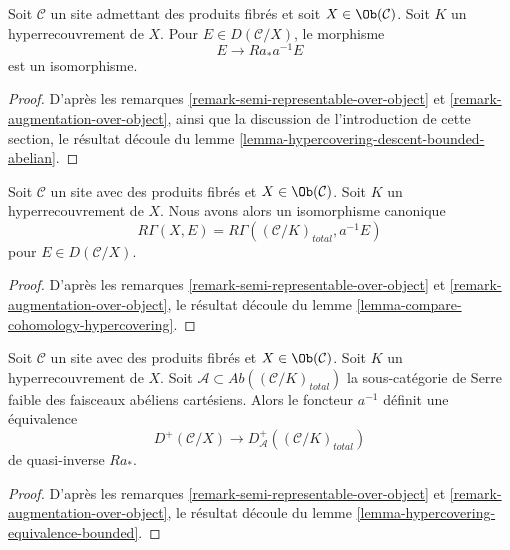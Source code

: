 \begin{lemma}
\label{lemma-hypercovering-X-descent-bounded-abelian}
Soit $\mathcal{C}$ un site admettant des produits fibrés et soit $X \in \Ob(\mathcal{C})$.
Soit $K$ un hyperrecouvrement de $X$. Pour
$E \in D(\mathcal{C}/X)$, le morphisme
$$
E \longrightarrow Ra_*a^{-1}E
$$
est un isomorphisme.
\end{lemma}

\begin{proof}
D'après les remarques \ref{remark-semi-representable-over-object} et
\ref{remark-augmentation-over-object}, ainsi que la discussion de
l'introduction de cette section,
le résultat découle du lemme \ref{lemma-hypercovering-descent-bounded-abelian}.
\end{proof}

\begin{lemma}
\label{lemma-compare-cohomology-hypercovering-X}
Soit $\mathcal{C}$ un site avec des produits fibrés et $X \in \Ob(\mathcal{C})$.
Soit $K$ un hyperrecouvrement de $X$.
Nous avons alors un isomorphisme canonique
$$
R\Gamma(X, E) = R\Gamma((\mathcal{C}/K)_{total}, a^{-1}E)
$$
pour $E \in D(\mathcal{C}/X)$.
\end{lemma}

\begin{proof}
D'après les remarques \ref{remark-semi-representable-over-object} et
\ref{remark-augmentation-over-object},
le résultat découle du lemme \ref{lemma-compare-cohomology-hypercovering}.
\end{proof}

\begin{lemma}
\label{lemma-hypercovering-X-equivalence-bounded}
Soit $\mathcal{C}$ un site avec des produits fibrés et $X \in \Ob(\mathcal{C})$.
Soit $K$ un hyperrecouvrement de $X$.
Soit $\mathcal{A} \subset \textit{Ab}((\mathcal{C}/K)_{total})$
la sous-catégorie de Serre faible des faisceaux abéliens cartésiens.
Alors le foncteur $a^{-1}$ définit une équivalence
$$
D^+(\mathcal{C}/X) \longrightarrow D_\mathcal{A}^+((\mathcal{C}/K)_{total})
$$
de quasi-inverse $Ra_*$.
\end{lemma}

\begin{proof}
D'après les remarques \ref{remark-semi-representable-over-object} et
\ref{remark-augmentation-over-object},
le résultat découle du lemme \ref{lemma-hypercovering-equivalence-bounded}.
\end{proof}








